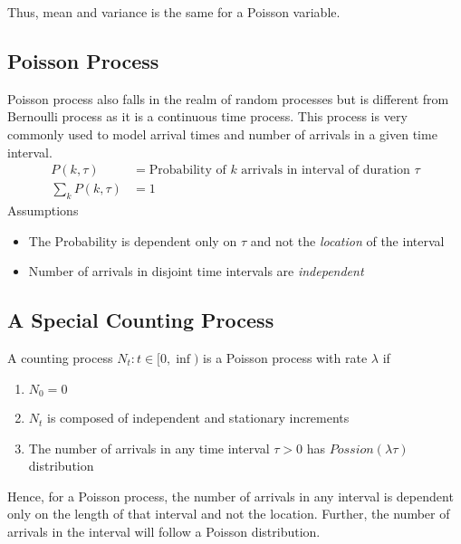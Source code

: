 \documentclass[../probability-notes.tex]{subfiles}
\begin{document}
    Thus, mean and variance is the same for a Poisson variable.

    \subsection{Poisson Process}
    Poisson process also falls in the realm of random processes but is different from Bernoulli process as it is a continuous time process. This process is very commonly used to model arrival times and number of arrivals in a given time interval.
    \begin{align*}
        P(k, \tau) &= \text{Probability of $k$ arrivals in interval of duration $\tau$}\\
        \sum_{k} P(k, \tau) &= 1 \tag*{for a given $\tau$}
    \end{align*}
    Assumptions
    \begin{itemize}
        \item The Probability is dependent only on $\tau$ and not the \emph{location} of the interval
        \item Number of arrivals in disjoint time intervals are \emph{independent}
    \end{itemize}
    
    \subsection{A Special Counting Process}
    A counting process $N_{t}:t \in [0,\inf)$ is a Poisson process with rate $\lambda$ if
    \begin{enumerate}
        \item $N_{0} = 0$
        \item $N_{t}$ is composed of independent and stationary increments
        \item The number of arrivals in any time interval $\tau > 0$ has $Possion(\lambda \tau)$ distribution 
    \end{enumerate}
    Hence, for a Poisson process, the number of arrivals in any interval is dependent only on the length of that interval and not the location. Further, the number of arrivals in the interval will follow a Poisson distribution.
\end{document}
